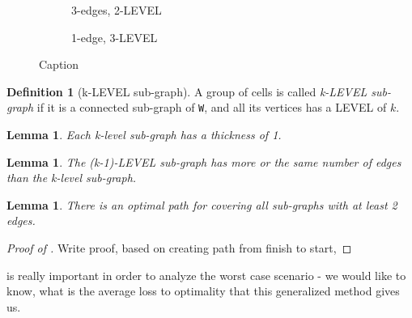 \documentclass[a4paper,11pt]{article}
\newtheorem{lemma}[theorem]{Lemma}
\theoremstyle{definition}
\newtheorem{definition}{Definition}[section]
\newcommand{\opp}{{{\sf O}}\xspace}
\newcommand{\io}{{\ensuremath{i_{\opp}}}\xspace}
\newcommand{\w}{{{\texttt W}}\xspace}
\begin{document}
\begin{figure}
    
    \begin{subfigure}[b]{.4\linewidth}
    \caption{3-edges, 2-LEVEL}\label{fig:3-edges, type B}
    \end{subfigure}
    \begin{subfigure}[b]{.4\linewidth}
    \caption{1-edge, 3-LEVEL}\label{fig:mouse}
    \end{subfigure}
    
    
    \caption{Caption}
    \label{figures:6 types of k-LEVEL sub-graphs}
\end{figure}

\begin{definition}[k-LEVEL sub-graph]
A group of cells is called \emph{k-LEVEL sub-graph} if it is a connected sub-graph of \w, and all its vertices has a LEVEL of $k$. \label{definitions: k-level subgraph}
\end{definition}


\begin{lemma}
Each k-level sub-graph has a thickness of 1. 
\end{lemma}
\begin{lemma}
The (k-1)-LEVEL sub-graph has more or the same number of edges than the k-level sub-graph.
\end{lemma}
\begin{lemma}
There is an optimal path for covering all sub-graphs with at least 2 edges.
\label{lemmas: optimality of subgraphs bigger than 1}
\end{lemma}
\begin{proof}[Proof of ]
Write proof, based on creating path from finish to start, 
\end{proof}
 is really important in order to analyze the worst case scenario - we would like to know, what is the average loss to optimality that this generalized method gives us. 
\end{document}
